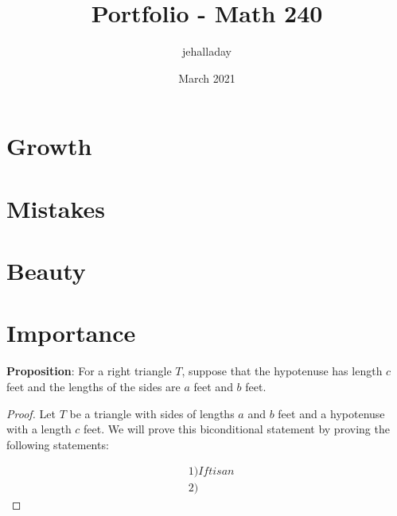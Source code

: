 \documentclass{article}
\title{Portfolio - Math 240}
\author{jehalladay }
\date{March 2021}
\begin{document}
\maketitle

\section{Growth}
\section{Mistakes}
\section{Beauty}
\section{Importance}


\noindent \textbf{Proposition}: For a right triangle $T$, suppose that the hypotenuse has length $c$ feet and the lengths of the sides are $a$ feet and $b$ feet.

\begin{proof}
    Let $T$ be a triangle with sides of lengths $a$ and $b$ feet and a hypotenuse with a length $c$ feet. We will prove this biconditional statement by proving the following statements:
    
    
\begin{align*}
    &1) If t is an \\
    &2)
\end{align*}

\end{proof}
\end{document}
